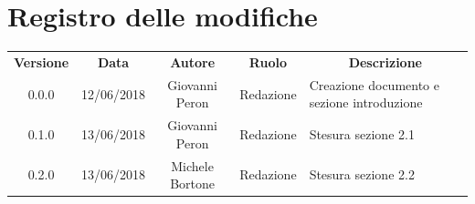 \documentclass[11pt,a4paper]{article}
\begin{document}
	

	\tableofcontents
	\newpage
	\section*{\centering Registro delle modifiche}
	\begin{tabularx}{\textwidth}{ c | c | c | c | X }
		\rowcolor{LightBlue}
		\color{white}\bfseries Versione & \color{white}\bfseries Data & \color{white}\bfseries Autore & \color{white}\bfseries Ruolo & \multicolumn{1}{c}{\color{white}\bfseries Descrizione}\\[0.25cm]
		0.0.0 & 12/06/2018 & Giovanni Peron & Redazione & Creazione documento e
sezione introduzione \\ \hline
0.1.0 & 13/06/2018 & Giovanni Peron & Redazione & Stesura sezione 2.1 \\ \hline
0.2.0 & 13/06/2018 & Michele Bortone & Redazione & Stesura sezione 2.2

	\end{tabularx}
	\newpage
		
	\newpage
	
		
	\newpage
	
	
	\newpage
	
	\newpage
	
	\newpage
		
\end{document}
